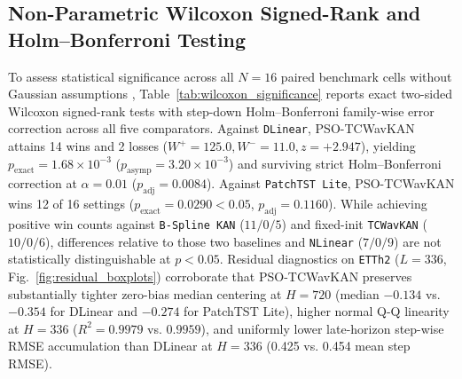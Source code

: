 \documentclass[pdflatex,sn-mathphys-num,referee,lineno]{sn-jnl}
\theoremstyle{thmstyleone}
\theoremstyle{thmstyletwo}
\theoremstyle{thmstylethree}
\begin{document}
\subsection{Non-Parametric Wilcoxon Signed-Rank and Holm--Bonferroni Testing}\label{subsec:wilcoxon}
To assess statistical significance across all $N=16$ paired benchmark cells without Gaussian assumptions \cite{wilcoxon1945individual, demsar2006statistical, diebold1995comparing, benavoli2017bayesian}, Table~\ref{tab:wilcoxon_significance} reports exact two-sided Wilcoxon signed-rank tests with step-down Holm--Bonferroni family-wise error correction \cite{holm1979simple} across all five comparators. Against \texttt{DLinear}, PSO-TCWavKAN attains 14 wins and 2 losses ($W^+ = 125.0, W^- = 11.0, z = +2.947$), yielding $p_{\mathrm{exact}} = 1.68 \times 10^{-3}$ ($p_{\mathrm{asymp}} = 3.20 \times 10^{-3}$) and surviving strict Holm--Bonferroni correction at $\alpha = 0.01$ ($p_{\mathrm{adj}} = 0.0084$). Against \texttt{PatchTST Lite}, PSO-TCWavKAN wins 12 of 16 settings ($p_{\mathrm{exact}} = 0.0290 < 0.05$, $p_{\mathrm{adj}} = 0.1160$). While achieving positive win counts against \texttt{B-Spline KAN} ($11/0/5$) and fixed-init \texttt{TCWavKAN} ($10/0/6$), differences relative to those two baselines and \texttt{NLinear} ($7/0/9$) are not statistically distinguishable at $p < 0.05$. Residual diagnostics on \texttt{ETTh2} ($L=336$, Fig.~\ref{fig:residual_boxplots}) corroborate that PSO-TCWavKAN preserves substantially tighter zero-bias median centering at $H=720$ (median $-0.134$ vs. $-0.354$ for DLinear and $-0.274$ for PatchTST Lite), higher normal Q-Q linearity at $H=336$ ($R^2 = 0.9979$ vs. $0.9959$), and uniformly lower late-horizon step-wise RMSE accumulation than DLinear at $H=336$ (0.425 vs. 0.454 mean step RMSE).

\begin{table}[htbp]
\centering
\caption{Paired two-sided Wilcoxon signed-rank and Holm--Bonferroni family-wise significance tests across $N=16$ configurations.}
\label{tab:wilcoxon_significance}
\end{table}
\end{document}
